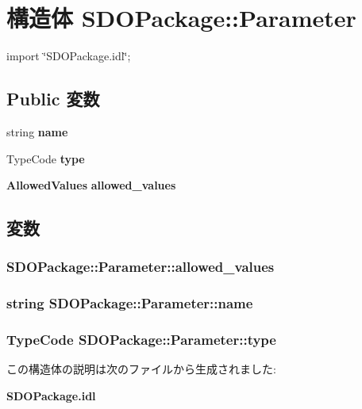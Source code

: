 \section{構造体 SDOPackage::Parameter}
\label{structSDOPackage_1_1Parameter}


{\ttfamily import \char`\"{}SDOPackage.idl\char`\"{};}

\subsection*{Public 変数}
\begin{DoxyCompactItemize}
\item 
string {\bf name}
\item 
TypeCode {\bf type}
\item 
{\bf AllowedValues} {\bf allowed\_\-values}
\end{DoxyCompactItemize}


\subsection{変数}
\subsubsection[{allowed\_\-values}]{ {\bf SDOPackage::Parameter::allowed\_\-values}}\label{structSDOPackage_1_1Parameter_a81cafbb66579be6e62740aa4d093b8be}
\subsubsection[{name}]{\setlength{\rightskip}{0pt plus 5cm}string {\bf SDOPackage::Parameter::name}}\label{structSDOPackage_1_1Parameter_a0da7260b28bd3569dad58dc7c5bba457}
\subsubsection[{type}]{\setlength{\rightskip}{0pt plus 5cm}TypeCode {\bf SDOPackage::Parameter::type}}\label{structSDOPackage_1_1Parameter_a013f778942e59807be89122000bb7f25}


この構造体の説明は次のファイルから生成されました:\begin{DoxyCompactItemize}
\item 
{\bf SDOPackage.idl}\end{DoxyCompactItemize}

